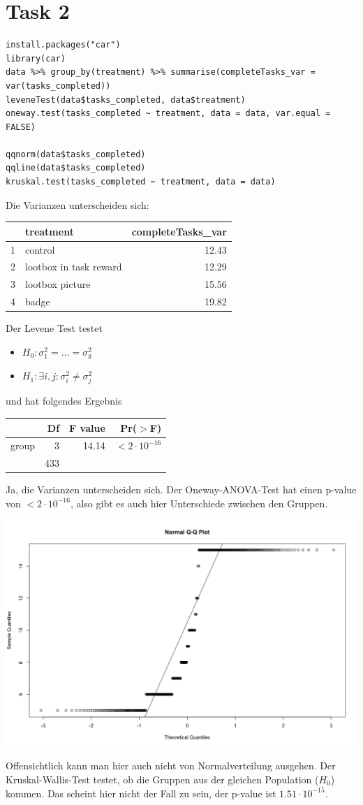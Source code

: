 \documentclass{article}
\begin{document}
	\section*{Task 2}
	\begin{lstlisting}
install.packages("car")
library(car)
data %>% group_by(treatment) %>% summarise(completeTasks_var = var(tasks_completed))
leveneTest(data$tasks_completed, data$treatment)
oneway.test(tasks_completed ~ treatment, data = data, var.equal = FALSE)

qqnorm(data$tasks_completed)
qqline(data$tasks_completed)
kruskal.test(tasks_completed ~ treatment, data = data)
	\end{lstlisting}
	Die Varianzen unterscheiden sich:
	\begin{center}
		\begin{tabular}{rlr}
  \hline
 & treatment & completeTasks\_var \\ 
  \hline
1 & control & 12.43 \\ 
  2 & lootbox in task reward & 12.29 \\ 
  3 & lootbox picture & 15.56 \\ 
  4 & badge & 19.82 \\ 
   \hline
\end{tabular}
	\end{center}
	Der Levene Test testet
	\begin{itemize}
		\item $H_0: \sigma^2_1 = \dots = \sigma^2_g$
		\item $H_1: \exists i,j: \sigma^2_i \neq \sigma^2_j$
	\end{itemize}
	und hat folgendes Ergebnis
	\begin{center}
		\begin{tabular}{lrrr}
  \hline
 & Df & F value & Pr($>$F) \\ 
  \hline
group & 3 & 14.14 & $<2\cdot 10^{-16}$ \\ 
    & 433 &  &  \\ 
   \hline
\end{tabular}
	\end{center}
	Ja, die Varianzen unterscheiden sich. Der Oneway-ANOVA-Test hat einen p-value von $<2\cdot 10^{-16}$, also gibt es auch hier Unterschiede zwischen den Gruppen.
	\begin{center}
		\includegraphics[scale=0.35]{qqplot.png}
	\end{center}
	Offensichtlich kann man hier auch nicht von Normalverteilung ausgehen. Der Kruskal-Wallis-Test testet, ob die Gruppen aus der gleichen Population ($H_0$) kommen. Das scheint hier nicht der Fall zu sein, der p-value ist $1.51\cdot 10^{-15}$.
\end{document}
